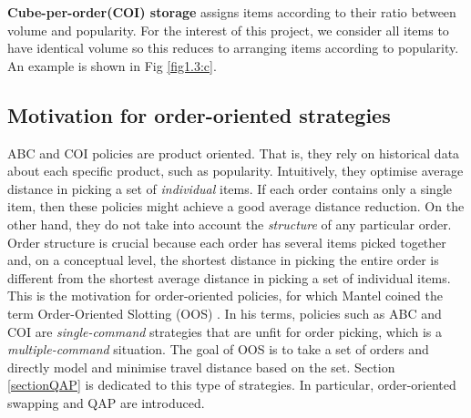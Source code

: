 \documentclass[hyp]{socreport}
\begin{document}
\textbf{Cube-per-order(COI) storage} assigns items according to their ratio between volume and popularity. For the interest of this project, we consider all items to have identical volume so this reduces to arranging items according to popularity. An example is shown in Fig \ref{fig1.3:c}.

\subsection{Motivation for order-oriented strategies}
ABC and COI policies are product oriented. That is, they rely on historical data about each specific product, such as popularity. Intuitively, they optimise average distance in picking a set of \textit{individual} items. If each order contains only a single item, then these policies might achieve a good average distance reduction. On the other hand, they do not take into account the \textit{structure} of any particular order. Order structure is crucial because each order has several items picked together and, on a conceptual level, the shortest distance in picking the entire order is different from the shortest average distance in picking a set of individual items. This is the motivation for order-oriented policies, for which Mantel coined the term Order-Oriented Slotting (OOS) \cite{Mantel:2007}. In his terms, policies such as ABC and COI are \textit{single-command} strategies that are unfit for order picking, which is a \textit{multiple-command} situation. The goal of OOS is to take a set of orders and directly model and minimise travel distance based on the set. Section \ref{sectionQAP} is dedicated to this type of strategies. In particular, order-oriented swapping and QAP are introduced.
\end{document}
